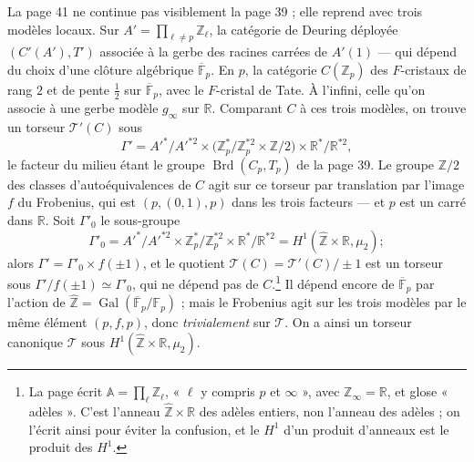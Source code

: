 \documentclass[11pt,a4paper]{article}
\begin{document}
La page 41 ne continue pas visiblement la page 39 ; elle reprend avec trois
modèles locaux. Sur $A' = \prod_{\ell \neq p} \mathbb{Z}_{\ell}$, la catégorie
de Deuring déployée $(C'(A'), T')$ associée à la gerbe des racines carrées de
$A'(1)$ --- qui dépend du choix d'une clôture algébrique
$\overline{\mathbb{F}}_{p}$. En $p$, la catégorie $C(\mathbb{Z}_{p})$ des
$F$-cristaux de rang $2$ et de pente $\tfrac{1}{2}$ sur
$\overline{\mathbb{F}}_{p}$, avec le $F$-cristal de Tate. À l'infini, celle
qu'on associe à une gerbe modèle $g_{\infty}$ sur $\mathbb{R}$. Comparant $C$ à
ces trois modèles, on trouve un torseur $\mathcal{T}'(C)$ sous
\[
  \Gamma' = A'^{*}/A'^{*2} \times \bigl( \mathbb{Z}_{p}^{*}/\mathbb{Z}_{p}^{*2}
  \times \mathbb{Z}/2 \bigr) \times \mathbb{R}^{*}/\mathbb{R}^{*2} ,
\]
le facteur du milieu étant le groupe $\operatorname{Brd}(C_{p}, T_{p})$ de la
page 39. Le groupe $\mathbb{Z}/2$ des classes d'autoéquivalences de $C$ agit sur
ce torseur par translation par l'image $f$ du Frobenius, qui est
$(p, (0,1), p)$ dans les trois facteurs --- et $p$ est un carré dans
$\mathbb{R}$. Soit $\Gamma'_{0}$ le sous-groupe
\[
  \Gamma'_{0} = A'^{*}/A'^{*2} \times \mathbb{Z}_{p}^{*}/\mathbb{Z}_{p}^{*2}
  \times \mathbb{R}^{*}/\mathbb{R}^{*2} = H^{1}(\widehat{\mathbb{Z}} \times
  \mathbb{R}, \mu_{2}) ;
\]
alors $\Gamma' = \Gamma'_{0} \times f(\pm 1)$, et le quotient
$\mathcal{T}(C) = \mathcal{T}'(C)/\pm 1$ est un torseur sous $\Gamma'/f(\pm 1)
\simeq \Gamma'_{0}$, qui ne dépend pas de $C$.\footnote{La page écrit
$\mathbb{A} = \prod_{\ell} \mathbb{Z}_{\ell}$, « $\ell$ y compris $p$ et
$\infty$ », avec $\mathbb{Z}_{\infty} = \mathbb{R}$, et glose « adèles ». C'est
l'anneau $\widehat{\mathbb{Z}} \times \mathbb{R}$ des adèles entiers, non l'anneau
des adèles ; on l'écrit ainsi pour éviter la confusion, et le $H^{1}$ d'un
produit d'anneaux est le produit des $H^{1}$.} Il dépend encore de
$\overline{\mathbb{F}}_{p}$ par l'action de $\widehat{\mathbb{Z}} =
\operatorname{Gal}(\overline{\mathbb{F}}_{p}/\mathbb{F}_{p})$ ; mais le Frobenius
agit sur les trois modèles par le même élément $(p, f, p)$, donc
\emph{trivialement} sur $\mathcal{T}$. On a ainsi un torseur canonique
$\mathcal{T}$ sous $H^{1}(\widehat{\mathbb{Z}} \times \mathbb{R}, \mu_{2})$.
\end{document}
